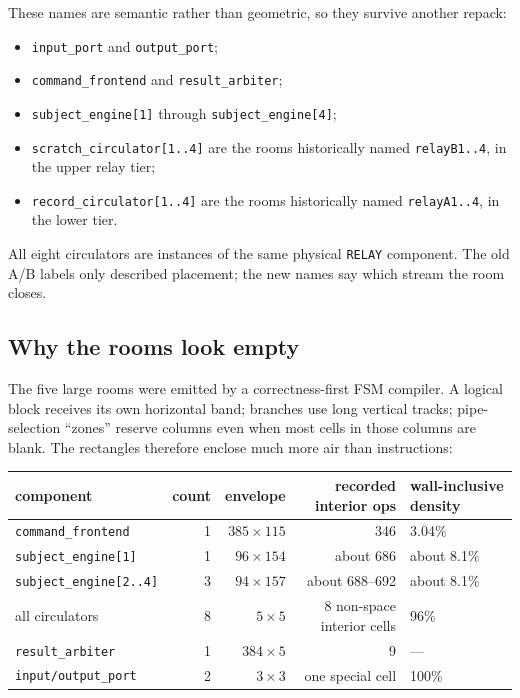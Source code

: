 \documentclass[11pt,a4paper]{article}
\begin{document}
These names are semantic rather than geometric, so they survive another
repack:

\begin{itemize}
  \item \texttt{input\_port} and \texttt{output\_port};
  \item \texttt{command\_frontend} and \texttt{result\_arbiter};
  \item \texttt{subject\_engine[1]} through
        \texttt{subject\_engine[4]};
  \item \texttt{scratch\_circulator[1..4]} are the rooms historically named
        \texttt{relayB1..4}, in the upper relay tier;
  \item \texttt{record\_circulator[1..4]} are the rooms historically named
        \texttt{relayA1..4}, in the lower tier.
\end{itemize}

All eight circulators are instances of the same physical
\texttt{RELAY} component. The old A/B labels only described placement; the
new names say which stream the room closes.

\subsection{Why the rooms look empty}

The five large rooms were emitted by a correctness-first FSM compiler. A
logical block receives its own horizontal band; branches use long vertical
tracks; pipe-selection ``zones'' reserve columns even when most cells in
those columns are blank. The rectangles therefore enclose much more air than
instructions:

\begin{center}
\small
\begin{tabular}{lrrrl}
component & count & envelope & recorded interior ops & wall-inclusive density\\ \hline
\texttt{command\_frontend} & 1 & $385\times115$ & 346 & 3.04\%\\
\texttt{subject\_engine[1]} & 1 & $96\times154$ & about 686 & about 8.1\%\\
\texttt{subject\_engine[2..4]} & 3 & $94\times157$ & about 688--692 & about 8.1\%\\
all circulators & 8 & $5\times5$ & 8 non-space interior cells & 96\%\\
\texttt{result\_arbiter} & 1 & $384\times5$ & 9 & ---\\
\texttt{input/output\_port} & 2 & $3\times3$ & one special cell & 100\%\\
\end{tabular}
\end{center}
\end{document}
